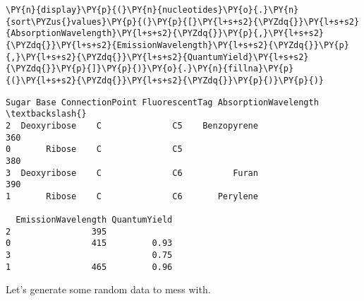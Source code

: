     
    \begin{tcolorbox}[breakable, size=fbox, boxrule=1pt, pad at break*=1mm,colback=cellbackground, colframe=cellborder]
\begin{Verbatim}[commandchars=\\\{\}]
\PY{n}{display}\PY{p}{(}\PY{n}{nucleotides}\PY{o}{.}\PY{n}{sort\PYZus{}values}\PY{p}{(}\PY{p}{[}\PY{l+s+s2}{\PYZdq{}}\PY{l+s+s2}{AbsorptionWavelength}\PY{l+s+s2}{\PYZdq{}}\PY{p}{,}\PY{l+s+s2}{\PYZdq{}}\PY{l+s+s2}{EmissionWavelength}\PY{l+s+s2}{\PYZdq{}}\PY{p}{,}\PY{l+s+s2}{\PYZdq{}}\PY{l+s+s2}{QuantumYield}\PY{l+s+s2}{\PYZdq{}}\PY{p}{]}\PY{p}{)}\PY{o}{.}\PY{n}{fillna}\PY{p}{(}\PY{l+s+s2}{\PYZdq{}}\PY{l+s+s2}{\PYZdq{}}\PY{p}{)}\PY{p}{)}
\end{Verbatim}
\end{tcolorbox}

    
    \begin{Verbatim}[commandchars=\\\{\}]
         Sugar Base ConnectionPoint FluorescentTag AbsorptionWavelength  \textbackslash{}
2  Deoxyribose    C              C5    Benzopyrene                  360   
0       Ribose    C              C5                                 380   
3  Deoxyribose    C              C6          Furan                  390   
1       Ribose    C              C6       Perylene                        

  EmissionWavelength QuantumYield  
2                395               
0                415         0.93  
3                            0.75  
1                465         0.96  
    \end{Verbatim}

    
    Let's generate some random data to mess with.

